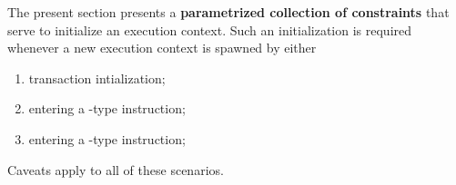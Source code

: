 The present section presents a \textbf{parametrized collection of constraints} that serve to initialize an execution context. Such an initialization is required whenever a new execution context is spawned by either
\begin{enumerate}
	\item transaction intialization;
	\item entering a -type instruction;
	\item entering a -type instruction;
\end{enumerate}
Caveats apply to all of these scenarios.

